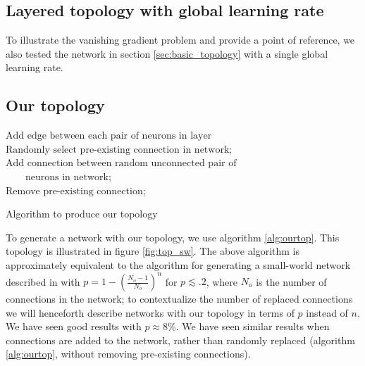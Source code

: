 \documentclass[utf8]{frontiersSCNS}
\begin{document}
\subsection{Layered topology with global learning rate}
\label{sec:basic_topology_uniform}

To illustrate the vanishing gradient problem and provide a point of reference, we also tested the network in section \ref{sec:basic_topology} with a single global learning rate.%

\subsection{Our topology}
\label{sec:our_topology}

\begin{algorithm}
{
	$\text{Add edge between each pair of neurons in layer}$
}
{
	$\text{Randomly select pre-existing connection in network}$;\\
	$\text{Add connection between random unconnected pair of}$\\
	$\qquad\text{neurons in network}$;\\
	$\text{Remove pre-existing connection}$;
}
\caption{Algorithm to produce our topology} \label{alg:ourtop}
\end{algorithm}

To generate a network with our topology, we use algorithm \ref{alg:ourtop}. This topology is illustrated in figure \ref{fig:top_sw}. The above algorithm is approximately equivalent to the algorithm for generating a small-world network described in \citep{watts98} with $p=1-(\frac{N_o-1}{N_o})^n$ for $p\lesssim .2$, where $N_o$ is the number of connections in the network; to contextualize the number of replaced connections we will henceforth describe networks with our topology in terms of $p$ instead of $n$. We have seen good results with $p\approx 8\%$. We have seen similar results when connections are added to the network, rather than randomly replaced (algorithm \ref{alg:ourtop}, without removing pre-existing connections).

\end{document}
